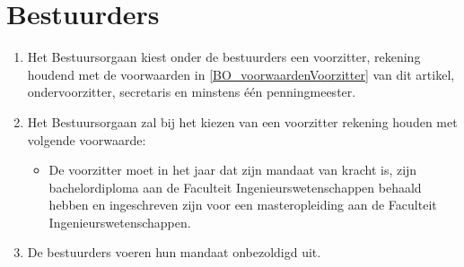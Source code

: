 \section{Bestuurders}
\begin{enumerate}
    \item Het Bestuursorgaan kiest onder de bestuurders een voorzitter, rekening houdend met de voorwaarden in \ref{BO_voorwaardenVoorzitter} van dit artikel, ondervoorzitter, secretaris en minstens één penningmeester. 
    \item\label{BO_voorwaardenVoorzitter} Het Bestuursorgaan zal bij het kiezen van een voorzitter rekening houden met volgende voorwaarde: 
        \begin{itemize}
        \item De voorzitter moet in het jaar dat zijn mandaat van kracht is, zijn bachelordiploma aan de Faculteit Ingenieurswetenschappen behaald hebben en ingeschreven zijn voor een masteropleiding aan de Faculteit Ingenieurswetenschappen.
        \end{itemize}
    \item De bestuurders voeren hun mandaat onbezoldigd uit.
\end{enumerate}

